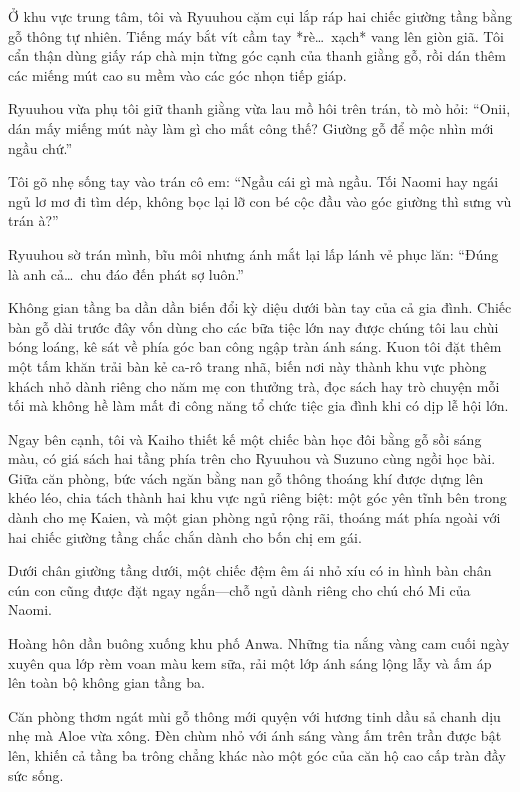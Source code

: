 ﻿\documentclass[../main.tex]{subfiles}
\begin{document}
Ở khu vực trung tâm, tôi và Ryuuhou cặm cụi lắp ráp hai chiếc giường tầng bằng gỗ thông tự nhiên. Tiếng máy bắt vít cầm tay *rè\dots\ xạch* vang lên giòn giã. Tôi cẩn thận dùng giấy ráp chà mịn từng góc cạnh của thanh giằng gỗ, rồi dán thêm các miếng mút cao su mềm vào các góc nhọn tiếp giáp.

Ryuuhou vừa phụ tôi giữ thanh giằng vừa lau mồ hôi trên trán, tò mò hỏi: ``Onii, dán mấy miếng mút này làm gì cho mất công thế? Giường gỗ để mộc nhìn mới ngầu chứ.''

Tôi gõ nhẹ sống tay vào trán cô em: ``Ngầu cái gì mà ngầu. Tối Naomi hay ngái ngủ lơ mơ đi tìm dép, không bọc lại lỡ con bé cộc đầu vào góc giường thì sưng vù trán à?''

Ryuuhou sờ trán mình, bĩu môi nhưng ánh mắt lại lấp lánh vẻ phục lăn: ``Đúng là anh cả\dots\ chu đáo đến phát sợ luôn.''

Không gian tầng ba dần dần biến đổi kỳ diệu dưới bàn tay của cả gia đình. Chiếc bàn gỗ dài trước đây vốn dùng cho các bữa tiệc lớn nay được chúng tôi lau chùi bóng loáng, kê sát về phía góc ban công ngập tràn ánh sáng. Kuon tôi đặt thêm một tấm khăn trải bàn kẻ ca-rô trang nhã, biến nơi này thành khu vực phòng khách nhỏ dành riêng cho năm mẹ con thưởng trà, đọc sách hay trò chuyện mỗi tối mà không hề làm mất đi công năng tổ chức tiệc gia đình khi có dịp lễ hội lớn.

Ngay bên cạnh, tôi và Kaiho thiết kế một chiếc bàn học đôi bằng gỗ sồi sáng màu, có giá sách hai tầng phía trên cho Ryuuhou và Suzuno cùng ngồi học bài. Giữa căn phòng, bức vách ngăn bằng nan gỗ thông thoáng khí được dựng lên khéo léo, chia tách thành hai khu vực ngủ riêng biệt: một góc yên tĩnh bên trong dành cho mẹ Kaien, và một gian phòng ngủ rộng rãi, thoáng mát phía ngoài với hai chiếc giường tầng chắc chắn dành cho bốn chị em gái.

Dưới chân giường tầng dưới, một chiếc đệm êm ái nhỏ xíu có in hình bàn chân cún con cũng được đặt ngay ngắn—chỗ ngủ dành riêng cho chú chó Mi của Naomi.

\ct

Hoàng hôn dần buông xuống khu phố Anwa. Những tia nắng vàng cam cuối ngày xuyên qua lớp rèm voan màu kem sữa, rải một lớp ánh sáng lộng lẫy và ấm áp lên toàn bộ không gian tầng ba.

Căn phòng thơm ngát mùi gỗ thông mới quyện với hương tinh dầu sả chanh dịu nhẹ mà Aloe vừa xông. Đèn chùm nhỏ với ánh sáng vàng ấm trên trần được bật lên, khiến cả tầng ba trông chẳng khác nào một góc của căn hộ cao cấp tràn đầy sức sống.
\end{document}
